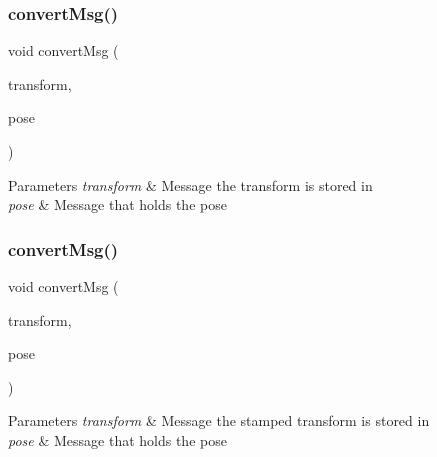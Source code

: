 \subsubsection{\texorpdfstring{convert\+Msg()}{convertMsg()}\hspace{0.1cm}{\footnotesize\ttfamily [13/14]}}
{\footnotesize\ttfamily void convert\+Msg (\begin{DoxyParamCaption}\item[{geometry\+\_\+msgs\+::\+Transform \&}]{transform,  }\item[{geometry\+\_\+msgs\+::\+Pose \&}]{pose }\end{DoxyParamCaption})\hspace{0.3cm}{\ttfamily [inline]}}


\begin{DoxyParams}{Parameters}
{\em transform} & Message the transform is stored in \\
\hline
{\em pose} & Message that holds the pose \\
\hline
\end{DoxyParams}
\mbox{\label{group__MultiRobotController_ga83f417b8e164774e4926508549543498}} 
\subsubsection{\texorpdfstring{convert\+Msg()}{convertMsg()}\hspace{0.1cm}{\footnotesize\ttfamily [14/14]}}
{\footnotesize\ttfamily void convert\+Msg (\begin{DoxyParamCaption}\item[{geometry\+\_\+msgs\+::\+Transform\+Stamped \&}]{transform,  }\item[{geometry\+\_\+msgs\+::\+Pose\+Stamped \&}]{pose }\end{DoxyParamCaption})\hspace{0.3cm}{\ttfamily [inline]}}


\begin{DoxyParams}{Parameters}
{\em transform} & Message the stamped transform is stored in \\
\hline
{\em pose} & Message that holds the pose \\
\hline
\end{DoxyParams}
